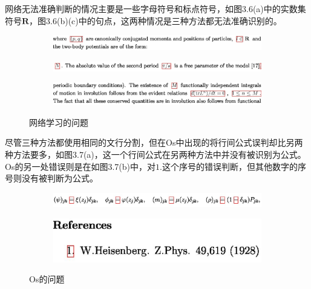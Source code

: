 网络无法准确判断的情况主要是一些字母符号和标点符号，如图3.6(a)中的实数集符号$\mathbf{R}$，图3.6(b)(c)中的句点，这两种情况是三种方法都无法准确识别的。
\begin{figure}[hp]
    \centering
    \begin{subfigure}[b]{\linewidth}
    \centering
    \includegraphics[scale=0.3]{eps/a21.eps}
    \caption{\label{fig:fig1}}
    \end{subfigure}

    \begin{subfigure}[b]{\linewidth}
    \centering
    \includegraphics[scale=0.3]{eps/a22.eps}
    \caption{\label{fig:fig2}}
    \end{subfigure}

    \begin{subfigure}[b]{\linewidth}
    \centering
    \includegraphics[scale=0.3]{eps/a23.eps}
    \caption{\label{fig:fig2}}
    \end{subfigure}

    \caption{网络学习的问题}
    \label{fig:label}
\end{figure}


尽管三种方法都使用相同的文行分割，但在Os中出现的将行间公式误判却比另两种方法要多，如图3.7(a)，这一个行间公式在另两种方法中并没有被识别为公式。Os的另一处错误则是在如图3.7(b)中，对$1.$这个序号的错误判断，但其他数字的序号则没有被判断为公式。
\begin{figure}[hp]
    \centering

    \begin{subfigure}[b]{\linewidth}
    \centering
    \includegraphics[scale=0.3]{eps/os1.eps}
    \caption{\label{fig:fig1}}
    \end{subfigure}

    \begin{subfigure}[b]{\linewidth}
    \centering
    \includegraphics[scale=0.3]{eps/os2.eps}
    \caption{\label{fig:fig2}}
    \end{subfigure}

    \caption{Os的问题}
    \label{fig:label}
\end{figure}

